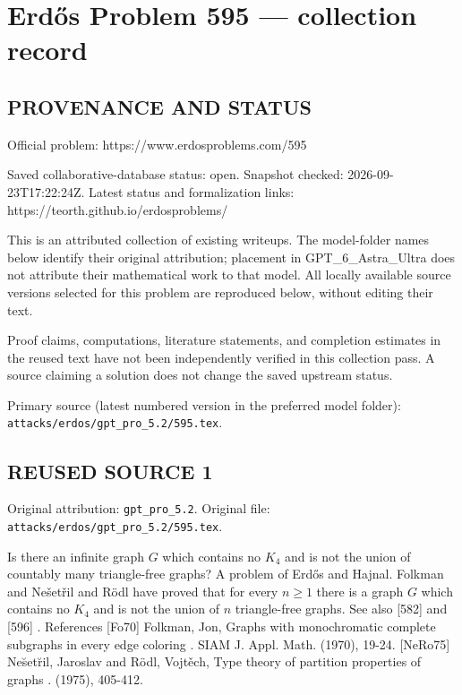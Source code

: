 \section*{Erd\H{o}s Problem 595 --- collection record}

\subsection*{PROVENANCE AND STATUS}
Official problem: https://www.erdosproblems.com/595

Saved collaborative-database status: open.
Snapshot checked: 2026-09-23T17:22:24Z.
Latest status and formalization links: https://teorth.github.io/erdosproblems/

This is an attributed collection of existing writeups. The model-folder names below identify their original attribution; placement in GPT\_6\_Astra\_Ultra does not attribute their mathematical work to that model. All locally available source versions selected for this problem are reproduced below, without editing their text.

Proof claims, computations, literature statements, and completion estimates in the reused text have not been independently verified in this collection pass. A source claiming a solution does not change the saved upstream status.

Primary source (latest numbered version in the preferred model folder): \texttt{attacks/erdos/gpt\_pro\_5.2/595.tex}.

\subsection*{REUSED SOURCE 1}
Original attribution: \texttt{gpt\_pro\_5.2}.
Original file: \texttt{attacks/erdos/gpt\_pro\_5.2/595.tex}.


Is there an infinite graph $G$ which contains no $K_4$ and is not the union of countably many triangle-free graphs? A problem of Erd\H{o}s and Hajnal. Folkman \cite{Fo70} and Ne\v{s}et\v{r}il and R\"{o}dl \cite{NeRo75} have proved that for every $n\geq 1$ there is a graph $G$ which contains no $K_4$ and is not the union of $n$ triangle-free graphs. See also [582] and [596] . References [Fo70] Folkman, Jon, Graphs with monochromatic complete subgraphs in every edge coloring . SIAM J. Appl. Math. (1970), 19-24. [NeRo75] Ne\u set\u ril, Jaroslav and R\"odl, Vojt\v ech, Type theory of partition properties of graphs . (1975), 405-412.

